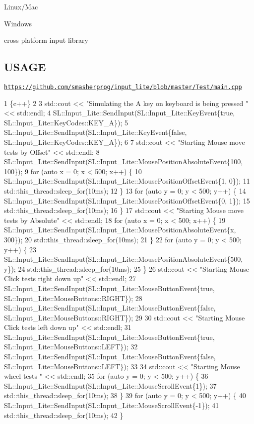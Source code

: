 Linux/\+Mac 

Windows 

cross platform input library

\subsection*{U\+S\+A\+GE}

\href{https://github.com/smasherprog/input_lite/blob/master/Test/main.cpp}{\tt https\+://github.\+com/smasherprog/input\+\_\+lite/blob/master/\+Test/main.\+cpp}


\begin{DoxyCode}
1 \{c++\}
2 
3     std::cout << "Simulating the A key on keyboard is being pressed " << std::endl;
4     SL::Input\_Lite::SendInput(SL::Input\_Lite::KeyEvent\{true, SL::Input\_Lite::KeyCodes::KEY\_A\});
5     SL::Input\_Lite::SendInput(SL::Input\_Lite::KeyEvent\{false, SL::Input\_Lite::KeyCodes::KEY\_A\});
6 
7     std::cout << "Starting Mouse move tests by Offset" << std::endl;
8     SL::Input\_Lite::SendInput(SL::Input\_Lite::MousePositionAbsoluteEvent\{100, 100\});
9     for (auto x = 0; x < 500; x++) \{
10         SL::Input\_Lite::SendInput(SL::Input\_Lite::MousePositionOffsetEvent\{1, 0\});
11         std::this\_thread::sleep\_for(10ms);
12     \}
13     for (auto y = 0; y < 500; y++) \{
14         SL::Input\_Lite::SendInput(SL::Input\_Lite::MousePositionOffsetEvent\{0, 1\});
15         std::this\_thread::sleep\_for(10ms);
16     \}
17     std::cout << "Starting Mouse move tests by Absolute" << std::endl;
18     for (auto x = 0; x < 500; x++) \{
19         SL::Input\_Lite::SendInput(SL::Input\_Lite::MousePositionAbsoluteEvent\{x, 300\});
20         std::this\_thread::sleep\_for(10ms);
21     \}
22     for (auto y = 0; y < 500; y++) \{
23         SL::Input\_Lite::SendInput(SL::Input\_Lite::MousePositionAbsoluteEvent\{500, y\});
24         std::this\_thread::sleep\_for(10ms);
25     \}
26     std::cout << "Starting Mouse Click tests right down up" << std::endl;
27     SL::Input\_Lite::SendInput(SL::Input\_Lite::MouseButtonEvent\{true, SL::Input\_Lite::MouseButtons::RIGHT\});
28     SL::Input\_Lite::SendInput(SL::Input\_Lite::MouseButtonEvent\{false,
       SL::Input\_Lite::MouseButtons::RIGHT\});
29 
30     std::cout << "Starting Mouse Click tests left down up" << std::endl;
31     SL::Input\_Lite::SendInput(SL::Input\_Lite::MouseButtonEvent\{true, SL::Input\_Lite::MouseButtons::LEFT\});
32     SL::Input\_Lite::SendInput(SL::Input\_Lite::MouseButtonEvent\{false, SL::Input\_Lite::MouseButtons::LEFT\});
33 
34     std::cout << "Starting Mouse wheel tests " << std::endl;
35     for (auto y = 0; y < 500; y++) \{
36         SL::Input\_Lite::SendInput(SL::Input\_Lite::MouseScrollEvent\{1\});
37         std::this\_thread::sleep\_for(10ms);
38     \}
39     for (auto y = 0; y < 500; y++) \{
40         SL::Input\_Lite::SendInput(SL::Input\_Lite::MouseScrollEvent\{-1\});
41         std::this\_thread::sleep\_for(10ms);
42     \}
\end{DoxyCode}
 